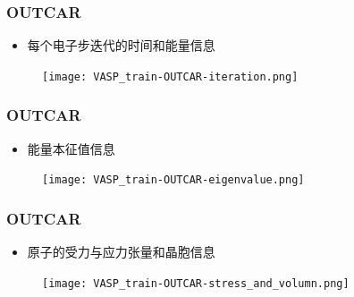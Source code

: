 \frame
{
	\frametitle{\textrm{OUTCAR}}
	\begin{itemize}
		\item 每个电子步迭代的时间和能量信息
	\end{itemize}
\begin{figure}[h!]
\centering
\texttt{[image: VASP\_train-OUTCAR-iteration.png]}
\caption{\fontsize{6.2pt}{5.2pt}}%
\label{VASP_train-OUTCAR-iteration}
\end{figure} 
}

\frame
{
	\frametitle{\textrm{OUTCAR}}
	\begin{itemize}
	\item 能量本征值信息
	\end{itemize}
\begin{figure}[h!]
\centering
\texttt{[image: VASP\_train-OUTCAR-eigenvalue.png]}
\caption{\fontsize{6.2pt}{5.2pt}}%
\label{VASP_train-OUTCAR-eigenvalue}
\end{figure}
}

\frame
{
	\frametitle{\textrm{OUTCAR}}
	\begin{itemize}
	\item 原子的受力与应力张量和晶胞信息
	\end{itemize}
\begin{figure}[h!]
\centering
\texttt{[image: VASP\_train-OUTCAR-stress\_and\_volumn.png]}
\caption{\fontsize{6.2pt}{5.2pt}}%
\label{VASP_train-OUTCAR-stress_and_volumn}
\end{figure}
}

